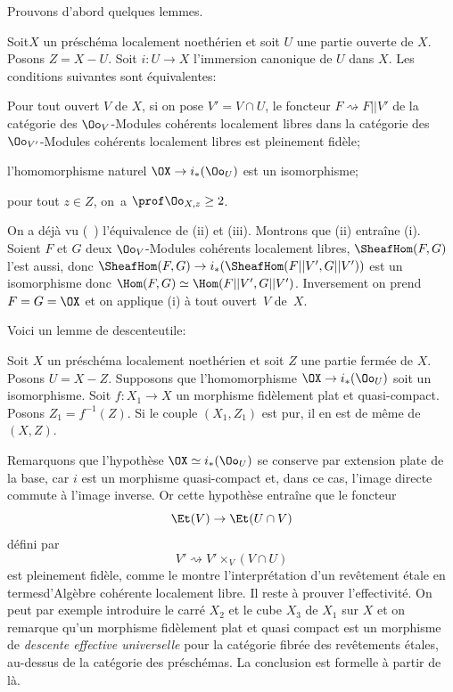 Prouvons d'abord quelques lemmes.

\begin{lemme} \label{X.3.5}
Soit\pageoriginale $X$ un pr\'esch\'ema localement noeth\'erien et soit $U$ une partie ouverte de $X$. Posons $Z=X-U$. Soit $i\colon U\to X$ l'immersion canonique de $U$ dans $X$. Les conditions suivantes sont \'equivalentes:
\begin{enumeratei}
\item
Pour tout ouvert $V$ de $X$, si on pose $V'=V\cap U$, le foncteur $F\rightsquigarrow F|{|V'}$ de la cat\'egorie des $\Oo_V$-Modules coh\'erents localement libres dans la cat\'egorie des $\Oo_{{V'}}$-Modules coh\'erents localement libres est pleinement fid\`ele;

\item
l'homomorphisme naturel $\OX \to i_\ast(\Oo_{U})$ est un isomorphisme;

\item
pour tout $z\in Z$, on~a $\prof\Oo_{X, z}\geq 2$.
\end{enumeratei}
\end{lemme}

On a d\'ej\`a vu (~) l'\'equivalence de (ii) et (iii). Montrons que (ii) entra\^ine (i). Soient $F$ et $G$ deux $\Oo_V$-Modules coh\'erents localement libres, $\SheafHom(F, G)$ l'est aussi, donc $\SheafHom(F, G)\to i_\ast(\SheafHom(F|{|V'}, G|{|V'}))$ est un isomorphisme donc $\Hom(F, G)\simeq\Hom(F|{|V'}, G|{|V'})$. Inversement on prend $F=G=\OX$ et on applique (i) \`a tout ouvert~$V$ de~$X$.

Voici un \og lemme de descente\fg utile:

\begin{lemme} \label{X.3.6} Soit $X$ un pr\'esch\'ema localement noeth\'erien et soit $Z$ une partie ferm\'ee de $X$. Posons $U=X-Z$. Supposons que l'homomorphisme $\OX \to i_\ast(\Oo_U)$ soit un isomorphisme. Soit $f\colon X_1\to X$ un morphisme fid\`element plat et quasi-compact. Posons $Z_1=f^{-1}(Z)$. Si le couple $(X_1, Z_1)$ est pur, il en est de m\^eme de $(X, Z)$.
\end{lemme}

Remarquons que l'hypoth\`ese $\OX\simeq i_\ast(\Oo_U)$ se conserve par extension plate de la base, car $i$ est un morphisme quasi-compact et, dans ce cas, l'image directe commute \`a l'image inverse. Or cette hypoth\`ese entra\^ine que le foncteur
\[
\Et(V) \to \Et(U\cap V)
\]
d\'efini par
\[
V'\rightsquigarrow V'\times_V(V\cap U)
\]
est pleinement fid\`ele, comme le montre l'interpr\'etation d'un rev\^etement \'etale en termes\pageoriginale d'Alg\`ebre coh\'erente localement libre. Il reste \`a prouver l'effectivit\'e. On peut par exemple introduire le carr\'e $X_2$ et le cube $X_3$ de $X_1$ sur $X$ et on remarque qu'un morphisme fid\`element plat et quasi compact est un morphisme de \emph{descente effective universelle} pour la cat\'egorie fibr\'ee des rev\^etements \'etales, au-dessus de la cat\'egorie des pr\'esch\'emas. La conclusion est formelle \`a partir de l\`a.

